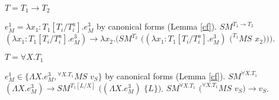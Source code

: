 \begin{case}
\begin{subcase}

$T=T_{1}\rightarrow T_{2}$

$e_{M}^{1}=\lambda x_{1}:T_{1}[T_{i}/T_{i}^{a}].e_{M}^{3}$ by canonical forms (Lemma \ref{cf}).  $SM^{T_{1}\rightarrow T_{2}}$ $(\lambda x_{1}:T_{1}[T_{i}/T_{i}^{a}].e_{M}^{3})\rightarrow\lambda x_{2}.(SM^{T_{2}}$ $((\lambda x_{1}:T_{1}[T_{i}/T_{i}^{a}].e_{M}^{3})$ $(^{T_{1}}MS$ $x_{2})))$.

\end{subcase}

\begin{subcase}

$T=\forall X.T_{1}$

$e_{M}^{1}\in\lbrace\Lambda X.e_{M}^{3},{^{\forall X.T_{1}}M}S$ $v_{S}\rbrace$ by canonical forms (Lemma \ref{cf}).  $SM^{\forall X.T_{1}}$ $(\Lambda X.e_{M}^{3})\rightarrow SM^{T_{1}[L/X]}$ $((\Lambda X.e_{M}^{3})$ $\lbrace L\rbrace)$.  $SM^{\forall X.T_{1}}$ $(^{\forall X.T_{1}}MS$ $v_{S})\rightarrow v_{S}$.

\end{subcase}

\end{case}